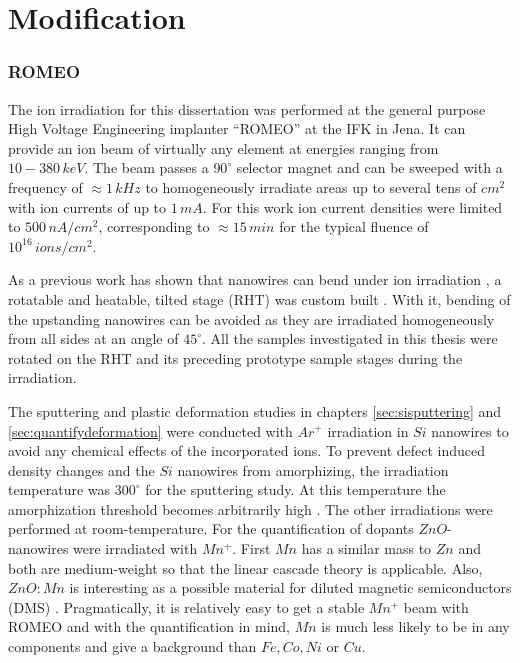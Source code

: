 \section{Modification}


\subsubsection{ROMEO}


The ion irradiation for this dissertation was performed at the general purpose High Voltage Engineering implanter ``ROMEO'' at the IFK in Jena. It can provide an ion beam of virtually any element at energies ranging from $10-380\,keV$. The beam passes a $90^\circ$ selector magnet and can be sweeped with a frequency of $\approx 1\,kHz$ to homogeneously irradiate areas up to several tens of $cm^2$ with ion currents of up to $1\,mA$. For this work ion current densities were limited to $500\,nA/cm^2$, corresponding to $\approx 15\,min$ for the typical fluence of $10^{16}\,ions/cm^2$.

As a previous work has shown that nanowires can bend under ion irradiation \cite{borschel_permanent_2011, borschel_ion-solid_2012}, a rotatable and heatable, tilted stage (RHT) was custom built \cite{noack_sputter_2014}. With it, bending of the upstanding nanowires can be avoided as they are irradiated homogeneously from all sides at an angle of $45^\circ$. All the samples investigated in this thesis were rotated on the RHT and its preceding prototype sample stages during the irradiation. 

The sputtering and plastic deformation studies in chapters \ref{sec:sisputtering} and \ref{sec:quantifydeformation} were conducted with $Ar^+$ irradiation in $Si$ nanowires to avoid any chemical effects of the incorporated ions. To prevent defect induced density changes and the $Si$ nanowires from amorphizing, the irradiation temperature was $300^\circ$ for the sputtering study. At this temperature the amorphization threshold becomes arbitrarily high \cite{pelaz_ion-beam-induced_2004}. The other irradiations were performed at room-temperature. For the quantification of dopants $ZnO$-nanowires were irradiated with $Mn^+$. First $Mn$ has a similar mass to $Zn$ and both are medium-weight so that the linear cascade theory is applicable. Also, $ZnO:Mn$ is interesting as a possible material for diluted magnetic semiconductors (DMS) \cite{furdyna_diluted_1988,norberg_synthesis_2004}. Pragmatically, it is relatively easy to get a stable $Mn^+$ beam with ROMEO and with the quantification in mind, $Mn$ is much less likely to be in any components and give a background than $Fe, Co, Ni$ or $Cu$.

